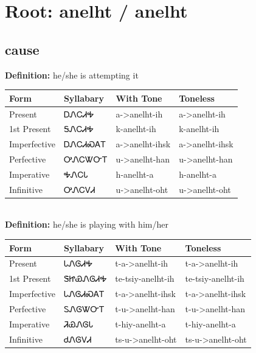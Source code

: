 \documentclass{article}%
\begin{document}
%
\normalsize%
\section*{Root: anelht / anelht}%
\subsection*{cause}%
\textbf{Definition: }%
he/she is attempting it%
\\[0.5em]%
\begin{tabular}{|l|l|l|l|}%
\hline%
\textbf{Form}&\textbf{Syllabary}&\textbf{With Tone}&\textbf{Toneless}\\%
\hline%
Present&ᎠᏁᏟᏗᎭ&a{-}>anelht{-}ih&a{-}>anelht{-}ih\\%
1st Present&ᎦᏁᏟᏗᎭ&k{-}anelht{-}ih&k{-}anelht{-}ih\\%
Imperfective&ᎠᏁᏟᏗᏍᎪᎢ&a{-}>anelht{-}ihsk&a{-}>anelht{-}ihsk\\%
Perfective&ᎤᏁᏟᏔᏅᎢ&u{-}>anelht{-}han&u{-}>anelht{-}han\\%
Imperative&ᎭᏁᏟᏓ&h{-}anelht{-}a&h{-}anelht{-}a\\%
Infinitive&ᎤᏁᏟᏙᏗ&u{-}>anelht{-}oht&u{-}>anelht{-}oht\\%
\hline%
\end{tabular}%
\\[1em]%
\textbf{Definition: }%
he/she is playing with him/her%
\\[0.5em]%
\begin{tabular}{|l|l|l|l|}%
\hline%
\textbf{Form}&\textbf{Syllabary}&\textbf{With Tone}&\textbf{Toneless}\\%
\hline%
Present&ᏓᏁᎶᏗᎭ&t{-}a{-}>anelht{-}ih&t{-}a{-}>anelht{-}ih\\%
1st Present&ᏕᏥᏯᏁᎶᏗᎭ&te{-}tsiy{-}anelht{-}ih&te{-}tsiy{-}anelht{-}ih\\%
Imperfective&ᏓᏁᎶᏗᏍᎪᎢ&t{-}a{-}>anelht{-}ihsk&t{-}a{-}>anelht{-}ihsk\\%
Perfective&ᏚᏁᎶᏔᏅᎢ&t{-}u{-}>anelht{-}han&t{-}u{-}>anelht{-}han\\%
Imperative&ᏘᏯᏁᎶᏓ&t{-}hiy{-}anelht{-}a&t{-}hiy{-}anelht{-}a\\%
Infinitive&ᏧᏁᎶᏙᏗ&ts{-}u{-}>anelht{-}oht&ts{-}u{-}>anelht{-}oht\\%
\hline%
\end{tabular}%
\\[1em]%
\end{document}
